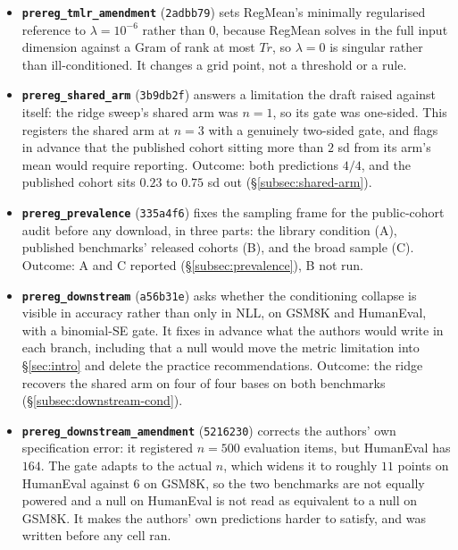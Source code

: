 \begin{itemize}
\item \textbf{\texttt{prereg\_tmlr\_amendment}} (\texttt{2adbb79}) sets
RegMean's minimally regularised reference to $\lambda = 10^{-6}$ rather
than $0$, because RegMean solves in the full input dimension against a Gram
of rank at most $Tr$, so $\lambda = 0$ is singular rather than
ill-conditioned. It changes a grid point, not a threshold or a rule.

\item \textbf{\texttt{prereg\_shared\_arm}} (\texttt{3b9db2f}) answers a
limitation the draft raised against itself: the ridge sweep's shared arm
was $n = 1$, so its gate was one-sided. This registers the shared arm at
$n = 3$ with a genuinely two-sided gate, and flags in advance that the
published cohort sitting more than $2$ sd from its arm's mean would
require reporting. Outcome: both predictions $4/4$, and the published
cohort sits $0.23$ to $0.75$ sd out (\S\ref{subsec:shared-arm}).

\item \textbf{\texttt{prereg\_prevalence}} (\texttt{335a4f6}) fixes the
sampling frame for the public-cohort audit before any download, in three
parts: the library condition (A), published benchmarks' released cohorts
(B), and the broad sample (C). Outcome: A and C reported
(\S\ref{subsec:prevalence}), B not run.

\item \textbf{\texttt{prereg\_downstream}} (\texttt{a56b31e}) asks whether
the conditioning collapse is visible in accuracy rather than only in NLL,
on GSM8K and HumanEval, with a binomial-SE gate. It fixes in advance what
the authors would write in each branch, including that a null would move the metric
limitation into \S\ref{sec:intro} and delete the practice recommendations.
Outcome: the ridge recovers the shared arm on four of four bases on both
benchmarks (\S\ref{subsec:downstream-cond}).

\item \textbf{\texttt{prereg\_downstream\_amendment}} (\texttt{5216230})
corrects the authors' own specification error: it registered $n = 500$ evaluation
items, but HumanEval has $164$. The gate adapts to the actual $n$, which
widens it to roughly $11$ points on HumanEval against $6$ on GSM8K, so the
two benchmarks are not equally powered and a null on HumanEval is not read
as equivalent to a null on GSM8K. It makes the authors' own predictions harder to
satisfy, and was written before any cell ran.


\end{itemize}
